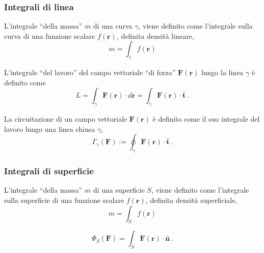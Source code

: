 \subsubsection{Integrali di linea}
\begin{definition}[Massa] L'integrale ``della massa'' $m$ di una curva $\gamma$, viene definito come l'integrale sulla curva di una funzione scalare $f(\mathbf{r})$, definita densità lineare,
    \begin{equation}
        m = \int_{\gamma} f(\mathbf{r})
    \end{equation}
\end{definition}
\begin{definition}[Lavoro] L'integrale ``del lavoro'' del campo vettoriale ``di forza'' $\mathbf{F}(\mathbf{r})$ lungo la linea $\gamma$ è definito come
    \begin{equation}
        L = \int_{\gamma} \mathbf{F}(\mathbf{r}) \cdot d \mathbf{r} = \int_{\gamma} \mathbf{F}(\mathbf{r}) \cdot \mathbf{\hat{t}} \ . 
    \end{equation}
\end{definition}
\begin{definition}[Circuitazione] La circuitazione di un campo vettoriale $\mathbf{F}(\mathbf{r})$ è definito come il suo integrale del lavoro lungo una linea chiusa $\gamma$,
    \begin{equation}
        \Gamma_{\gamma}(\mathbf{F}) := \oint_{\gamma} \mathbf{F}(\mathbf{r}) \cdot \mathbf{\hat{t}} \ .
    \end{equation}
\end{definition}
\subsubsection{Integrali di superficie}
\begin{definition}[Massa] L'integrale ``della massa'' $m$ di una superficie $S$, viene definito come l'integrale sulla superficie di una funzione scalare $f(\mathbf{r})$, definita densità superficiale,
    \begin{equation}
        m = \int_{S} f(\mathbf{r})
    \end{equation}
\end{definition}
\begin{definition}[Flusso]
    \begin{equation}
        \Phi_S(\mathbf{F}) = \int_S \mathbf{F}(\mathbf{r}) \cdot \mathbf{\hat{n}} \ .
    \end{equation}
\end{definition}
